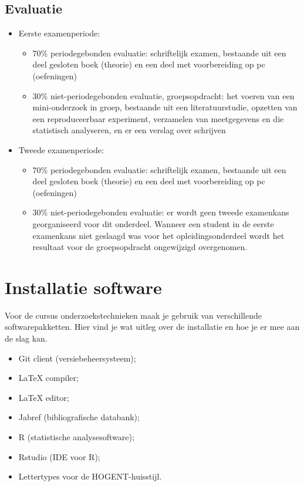 \subsection{Evaluatie}



\begin{itemize}
  \item Eerste examenperiode:
  \begin{itemize}
    \item 70\% periodegebonden evaluatie: schriftelijk examen, bestaande uit een deel gesloten boek (theorie) en een deel met voorbereiding op pc (oefeningen)
    \item 30\% niet-periodegebonden evaluatie, groepsopdracht: het voeren van een mini-onderzoek in groep, bestaande uit een literatuurstudie, opzetten van een reproduceerbaar experiment, verzamelen van meetgegevens en die statistisch analyseren, en er een verslag over schrijven
  \end{itemize}
  \item Tweede examenperiode:
  \begin{itemize}
    \item 70\% periodegebonden evaluatie: schriftelijk examen, bestaande uit een deel gesloten boek (theorie) en een deel met voorbereiding op pc (oefeningen)
    \item 30\% niet-periodegebonden evaluatie: er wordt geen tweede examenkans georganiseerd voor dit onderdeel. Wanneer een student in de eerste examenkans niet geslaagd was voor het opleidingsonderdeel wordt het resultaat voor de groepsopdracht ongewijzigd overgenomen.
  \end{itemize}
\end{itemize}

\section{Installatie software}
\label{sec:installatie-software}

Voor de cursus onderzoekstechnieken maak je gebruik van verschillende softwarepakketten. Hier vind je wat uitleg over de installatie en hoe je er mee aan de slag kan.

\begin{itemize}
  \item Git client (versiebeheersysteem);
  \item \LaTeX{} compiler;
  \item \LaTeX{} editor;
  \item Jabref (bibliografische databank);
  \item R (statistische analysesoftware);
  \item Rstudio (IDE voor R);
  \item Lettertypes voor de HOGENT-huisstijl.
\end{itemize}

